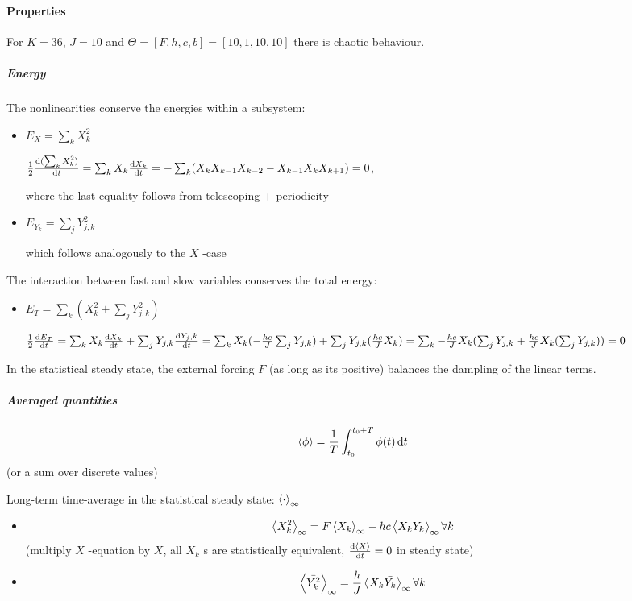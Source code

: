 \documentclass[11pt]{article}
\begin{document}
\paragraph{Properties}
\label{sec:org00f6dd6}

For \(K=36\), \(J=10\) and \(\Theta = [F, h, c, b] = [10, 1, 10, 10]\) there is chaotic behaviour.

\subparagraph{Energy}
\label{sec:org837bc27}

The nonlinearities conserve the energies within a subsystem:
\begin{itemize}
\item \(E_X = \sum_k X_k^2\)

\(\frac{1}{2} \dv{(\sum_k X_k^2)}{t} =
         \sum_k X_k \dv{X_k}{t} =
         -\sum_k (X_k X_{k-1} X_{k-2} - X_{k-1} X_{k} X_{k+1}) =
         0\),

where the last equality follows from telescoping + periodicity
\item \(E_{Y_k} = \sum_j Y_{j,k}^2\)

which follows analogously to the \(X\) -case
\end{itemize}

The interaction between fast and slow variables conserves the total energy:
\begin{itemize}
\item \(E_{T} = \sum_k (X_k^2 + \sum_j Y_{j,k}^2)\)

\(\frac{1}{2} \dv{E_{T}}{t} =
         \sum_k X_k \dv{X_k}{t} + \sum_j Y_{j,k} \dv{Y_j,k}{t} =
         \sum_k X_k (- \frac{hc}{J} \sum_j Y_{j,k}) + \sum_j Y_{j,k} (\frac{hc}{J} X_k) =
         \sum_k - \frac{hc}{J} X_k (\sum_j Y_{j,k} + \frac{hc}{J} X_k (\sum_j Y_{j,k})) = 
         0\)
\end{itemize}

In the statistical steady state, the external forcing \(F\) (as long as its positive) balances
the dampling of the linear terms.

\subparagraph{Averaged quantities}
\label{sec:orgd2d820e}

$$\expval{\phi} = \frac{1}{T} \int_{t_0}^{t_0 + T} \phi(t) \dd{t}$$ (or a sum over discrete values)

Long-term time-average in the statistical steady state: \(\expval{\cdot}_{\infty}\)

\begin{itemize}
\item \begin{equation}
\label{eqn:equilibrium_X}
   \expval{X_k^2}_\infty = F \expval{X_k}_{\infty} - hc \expval{X_k\bar{Y_k}}_\infty \forall k
\end{equation}
(multiply \(X\) -equation by \(X\), all \(X_k\) s are statistically equivalent, \(\dv{\expval{X}}{t} = 0\) in steady state)
\item \begin{equation}
\label{eqn:equilibrium_Y}
  \expval{\bar{Y_k^2}}_{\infty} = \frac{h}{J} \expval{X_k \bar{Y_k}}_{\infty} \forall k
\end{equation}
\end{itemize}
\end{document}
